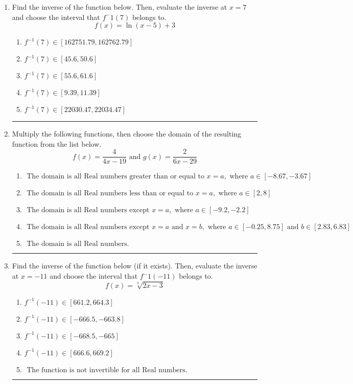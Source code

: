 \documentclass[14pt]{extbook}
\newcommand{\litem}[1]{\item#1\hspace*{-1cm}\rule{\textwidth}{0.4pt}}
\begin{document}
\begin{enumerate}
\litem{
Find the inverse of the function below. Then, evaluate the inverse at $x = 7$ and choose the interval that $f^-1(7)$ belongs to.\[ f(x) = \ln{(x-5)}+3 \]\begin{enumerate}[label=\Alph*.]
\item \( f^{-1}(7) \in [162751.79, 162762.79] \)
\item \( f^{-1}(7) \in [45.6, 50.6] \)
\item \( f^{-1}(7) \in [55.6, 61.6] \)
\item \( f^{-1}(7) \in [9.39, 11.39] \)
\item \( f^{-1}(7) \in [22030.47, 22034.47] \)

\end{enumerate} }
\litem{
Multiply the following functions, then choose the domain of the resulting function from the list below.\[ f(x) = \frac{4}{4x-19} \text{ and } g(x) = \frac{2}{6x-29} \]\begin{enumerate}[label=\Alph*.]
\item \( \text{ The domain is all Real numbers greater than or equal to } x = a, \text{ where } a \in [-8.67, -3.67] \)
\item \( \text{ The domain is all Real numbers less than or equal to } x = a, \text{ where } a \in [2, 8] \)
\item \( \text{ The domain is all Real numbers except } x = a, \text{ where } a \in [-9.2, -2.2] \)
\item \( \text{ The domain is all Real numbers except } x = a \text{ and } x = b, \text{ where } a \in [-0.25, 8.75] \text{ and } b \in [2.83, 6.83] \)
\item \( \text{ The domain is all Real numbers. } \)

\end{enumerate} }
\litem{
Find the inverse of the function below (if it exists). Then, evaluate the inverse at $x = -11$ and choose the interval that $f^-1(-11)$ belongs to.\[ f(x) = \sqrt[3]{2 x - 3} \]\begin{enumerate}[label=\Alph*.]
\item \( f^{-1}(-11) \in [661.2, 664.3] \)
\item \( f^{-1}(-11) \in [-666.5, -663.8] \)
\item \( f^{-1}(-11) \in [-668.5, -665] \)
\item \( f^{-1}(-11) \in [666.6, 669.2] \)
\item \( \text{ The function is not invertible for all Real numbers. } \)


\end{enumerate}}
\end{enumerate}
\end{document}
